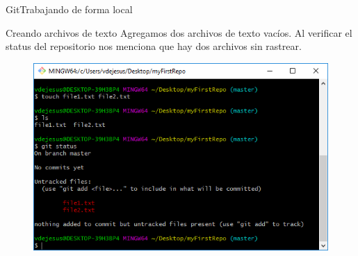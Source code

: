 \documentclass[10pt]{beamer}
\begin{document}
\begin{frame}{Git}{Trabajando de forma local}

\begin{block}{Creando archivos de texto}
Agregamos dos archivos de texto vacíos. Al verificar el status del repositorio nos menciona que hay dos archivos sin rastrear.

\begin{figure}[h!]
\centering
\includegraphics [scale=0.5]{step2}
\label{fig:gitclone3}
\end{figure}

\end{block}

\end{frame}
\end{document}
